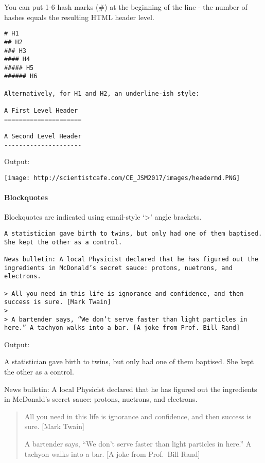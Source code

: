 \documentclass[
]{article}
\begin{document}
You can put 1-6 hash marks (\#) at the beginning of the line - the
number of hashes equals the resulting HTML header level.

\begin{verbatim}
# H1
## H2
### H3
#### H4
##### H5
###### H6

Alternatively, for H1 and H2, an underline-ish style:

A First Level Header
=====================

A Second Level Header
---------------------
\end{verbatim}

Output:

\texttt{[image: http://scientistcafe.com/CE\_JSM2017/images/headermd.PNG]}

\hypertarget{blockquotes}{%
\paragraph{Blockquotes}\label{blockquotes}}

Blockquotes are indicated using email-style `\textgreater{}' angle
brackets.

\begin{verbatim}
A statistician gave birth to twins, but only had one of them baptised. She kept the other as a control.

News bulletin: A local Physicist declared that he has figured out the ingredients in McDonald’s secret sauce: protons, nuetrons, and electrons.

> All you need in this life is ignorance and confidence, and then success is sure. [Mark Twain]
> 
> A bartender says, “We don’t serve faster than light particles in here.” A tachyon walks into a bar. [A joke from Prof. Bill Rand]
\end{verbatim}

Output:

A statistician gave birth to twins, but only had one of them baptised.
She kept the other as a control.

News bulletin: A local Physicist declared that he has figured out the
ingredients in McDonald's secret sauce: protons, nuetrons, and
electrons.

\begin{quote}
All you need in this life is ignorance and confidence, and then success
is sure. {[}Mark Twain{]}

A bartender says, ``We don't serve faster than light particles in
here.'' A tachyon walks into a bar. {[}A joke from Prof.~Bill Rand{]}
\end{quote}
\end{document}
